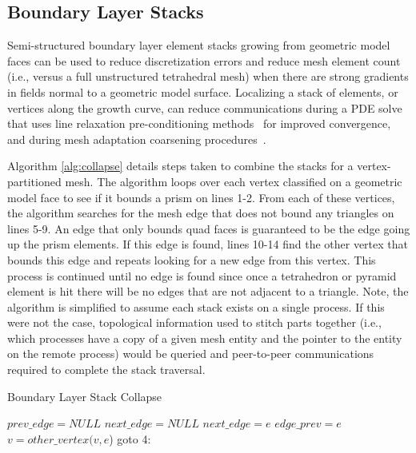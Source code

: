 \documentclass[conference]{IEEEtran}
\begin{document}
\subsection{Boundary Layer Stacks}

Semi-structured boundary layer element stacks growing from geometric model faces can
be used to reduce discretization errors and reduce mesh element count (i.e., versus
a full unstructured tetrahedral mesh) when there are strong gradients in
fields normal to a geometric model surface.
Localizing a stack of elements, or vertices along the growth curve, can reduce
communications during a PDE solve that uses line relaxation pre-conditioning
methods~\cite{wesseling2001311} for improved convergence, and during mesh
adaptation coarsening procedures~\cite{chitale-aiaa14,Sahn07,loseille20093d}.

Algorithm \ref{alg:collapse} details steps taken to
combine the stacks for a vertex-partitioned mesh. The algorithm loops over each
vertex classified on a geometric
model face to see if it bounds a prism on lines 1-2. From each of these vertices, the
algorithm searches for the mesh edge that does not bound any triangles on lines 5-9. An edge
that only bounds quad faces is guaranteed to be the edge going up the prism elements. If
this edge is found, lines 10-14 find the other vertex that bounds this edge and repeats
looking for a new edge from this vertex. This process is continued until no edge is found
since once a tetrahedron or pyramid element is hit there will be no edges that are
not adjacent to a triangle.
Note, the algorithm is simplified to assume each stack exists on a single
process.
If this were not the case, topological information used to stitch parts
together (i.e., which processes have a copy of a given mesh entity and the
pointer to the entity on the remote process) would be queried and peer-to-peer
communications required to complete the stack traversal.

\begin{algorithm}
  \caption{Boundary Layer Stack Collapse}
  \label{alg:collapse}
  \small
  \begin{algorithmic}[1]
    \State $prev\_edge = NULL$
    \State $next\_edge = NULL$
    \State $next\_edge = e$
    \EndIf
    \EndFor
    \State $edge\_prev = e$
    \State $v = other\_vertex(v,e$)
    \State goto 4:
    \EndIf
    \EndIf
    \EndFor
  \end{algorithmic}
\end{algorithm}
\end{document}
